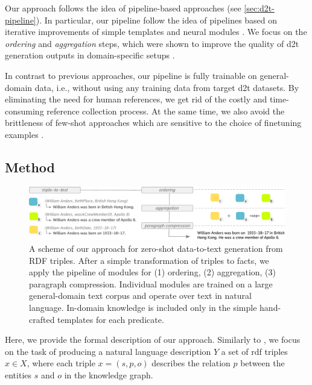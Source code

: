 Our approach follows the idea of pipeline-based approaches (see \autoref{sec:d2t-pipeline}). In particular, our pipeline follow the idea of pipelines based on iterative improvements of simple templates  \cite{laha2020scalable} and neural modules \cite{ferreiraNeuralDatatotextGeneration2019}. We focus on the \emph{ordering} and \emph{aggregation} steps, which were shown to improve the quality of \ac{d2t} generation outputs in domain-specific setups \cite{moryossef2019improving,moryossef2019step,trisedyaSentenceGenerationEntity2020,su2021plan}.

In contrast to previous approaches, our pipeline is fully trainable on general-domain data, i.e., without using any training data from target \ac{d2t} datasets. By eliminating the need for human references, we get rid of the costly and time-consuming reference collection process. At the same time, we also avoid the brittleness of few-shot approaches which are sensitive to the choice of finetuning examples \cite{chenFewShotNLGPreTrained2019,suFewShotTabletoTextGeneration2021,changSelectGenChallengeFinding2021}.

\subsection{Method}
\label{sec:pipeline:method}
\begin{figure}[t]
    \centering
    \includegraphics[width=\textwidth]{img/zeroshot_pipeline.pdf}
    \caption{A scheme of our approach for zero-shot data-to-text generation from RDF triples. After a simple transformation of triples to facts, we apply the pipeline of modules for (1) ordering, (2) aggregation, (3) paragraph compression. Individual modules are trained on a large general-domain text corpus and operate over text in natural language. In-domain knowledge is included only in the simple hand-crafted templates for each predicate.}\label{fig:zeroshot:pipeline}
\end{figure}
Here, we provide the formal description of our approach. Similarly to , we focus on the task of producing a natural language description $Y$ a set of \ac{rdf} triples $x \in X$, where each triple $x = (s, p, o)$ describes the relation $p$ between the entities $s$ and $o$ in the knowledge graph.


